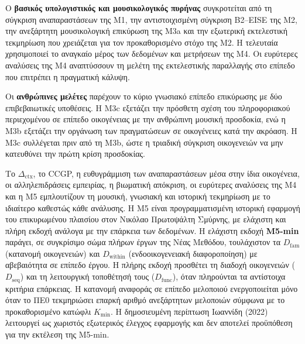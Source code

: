 \documentclass[11pt,a4paper]{article}
\begin{document}
Ο \textbf{βασικός υπολογιστικός και μουσικολογικός πυρήνας} συγκροτείται από τη σύγκριση αναπαραστάσεων της M1, την αντιστοιχισμένη σύγκριση B2--EISE της M2, την ανεξάρτητη μουσικολογική επικύρωση της M3a και την εξωτερική εκτελεστική τεκμηρίωση που χρειάζεται για τον προκαθορισμένο στόχο της M2. Η τελευταία χρησιμοποιεί το αναγκαίο μέρος των δεδομένων και μετρήσεων της M4. Οι ευρύτερες αναλύσεις της M4 αναπτύσσουν τη μελέτη της εκτελεστικής παραλλαγής στο επίπεδο που επιτρέπει η πραγματική κάλυψη.

Οι \textbf{ανθρώπινες μελέτες} παρέχουν το κύριο γνωσιακό επίπεδο επικύρωσης με δύο επιβεβαιωτικές υποθέσεις. Η M3c εξετάζει την πρόσθετη σχέση του πληροφοριακού περιεχομένου σε επίπεδο οικογένειας με την ανθρώπινη μουσική προσδοκία, ενώ η M3b εξετάζει την οργάνωση των πραγματώσεων σε οικογένειες κατά την ακρόαση. Η M3c συλλέγεται πριν από τη M3b, ώστε η τριαδική σύγκριση οικογενειών να μην κατευθύνει την πρώτη κρίση προσδοκίας.

Το $\Delta_{\mathrm{ctx}}$, το CCGP, η ευθυγράμμιση των αναπαραστάσεων μέσα στην ίδια οικογένεια, οι αλληλεπιδράσεις εμπειρίας, η βιωματική απόκριση, οι ευρύτερες αναλύσεις της M4 και η M5 εμπλουτίζουν τη μουσική, γνωσιακή και ιστορική τεκμηρίωση με το ιδιαίτερο καθεστώς κάθε ανάλυσης. Η M5 είναι προγραμματισμένη ιστορική εφαρμογή του επικυρωμένου πλαισίου στον Νικόλαο Πρωτοψάλτη Σμύρνης, με ελάχιστη και πλήρη εκδοχή ανάλογα με την επάρκεια των δεδομένων. Η ελάχιστη εκδοχή \textbf{M5-min} παράγει, σε συγκρίσιμο σώμα πλήρων έργων της Νέας Μεθόδου, τουλάχιστον τα $D_{\mathrm{fam}}$ (κατανομή οικογενειών) και $D_{\mathrm{within}}$ (ενδοοικογενειακή διαφοροποίηση) με αβεβαιότητα σε επίπεδο έργου. Η πλήρης εκδοχή προσθέτει τη διαδοχή οικογενειών ($D_{\mathrm{seq}}$) και τη λειτουργική τοποθέτησή τους ($D_{\mathrm{func}}$), όταν πληρούνται τα αντίστοιχα κριτήρια επάρκειας. Η κατανομή αναφοράς σε επίπεδο μελοποιού ενεργοποιείται μόνο όταν το ΠΕ0 τεκμηριώσει επαρκή αριθμό ανεξάρτητων μελοποιών σύμφωνα με το προκαθορισμένο κατώφλι $K_{\min}$. Η δημοσιευμένη περίπτωση Ιωαννίδη (2022) λειτουργεί ως χωριστός εξωτερικός έλεγχος εφαρμογής και δεν αποτελεί προϋπόθεση για την εκτέλεση της M5-min.
\end{document}
